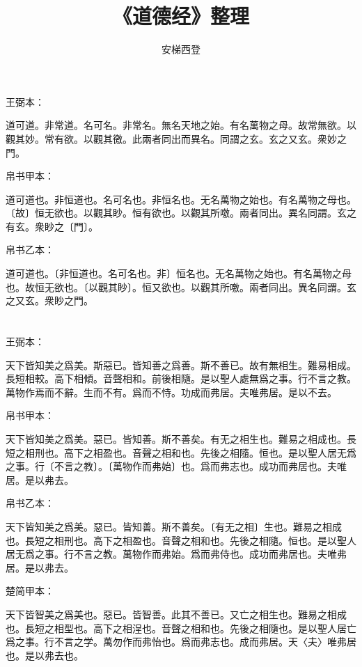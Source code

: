\documentclass[a5paper]{ctexbook}
\title{《道德经》整理}
\author{安梯西登}
\date{}
\begin{document}
    \maketitle

    \tableofcontents

    \chapter{}
    王弼本：

    道可道。非常道。名可名。非常名。無名天地之始。有名萬物之母。故常無欲。以觀其妙。常有欲。以觀其徼。此兩者同出而異名。同謂之玄。玄之又玄。衆妙之門。

    
    帛书甲本：

    道可道也。非恒道也。名可名也。非恒名也。无名萬物之始也。有名萬物之母也。〔故〕恒无欲也。以觀其眇。恒有欲也。以觀其所噭。兩者同出。異名同謂。玄之有玄。衆眇之〔門〕。

    帛书乙本：

    道可道也。〔非恒道也。名可名也。非〕恒名也。无名萬物之始也。有名萬物之母也。故恒无欲也。〔以觀其眇〕。恒又欲也。以觀其所噭。兩者同出。異名同謂。玄之又玄。衆眇之門。

    \chapter{}
    王弼本：

    天下皆知美之爲美。斯惡已。皆知善之爲善。斯不善已。故有無相生。難易相成。長短相較。高下相傾。音聲相和。前後相隨。是以聖人處無爲之事。行不言之教。萬物作焉而不辭。生而不有。爲而不恃。功成而弗居。夫唯弗居。是以不去。

    
    帛书甲本：

    天下皆知美之爲美。惡已。皆知善。斯不善矣。有无之相生也。難易之相成也。長短之相刑也。高下之相盈也。音聲之相和也。先後之相隨。恒也。是以聖人居无爲之事。行〔不言之教〕。〔萬物作而弗始〕也。爲而弗志也。成功而弗居也。夫唯居。是以弗去。

    帛书乙本：

    天下皆知美之爲美。惡已。皆知善。斯不善矣。〔有无之相〕生也。難易之相成也。長短之相刑也。高下之相盈也。音聲之相和也。先後之相隨。恒也。是以聖人居无爲之事。行不言之教。萬物作而弗始。爲而弗侍也。成功而弗居也。夫唯弗居。是以弗去。

    楚简甲本：

    天下皆智美之爲美也。惡已。皆智善。此其不善已。又亡之相生也。難易之相成也。長短之相型也。高下之相浧也。音聲之相和也。先後之相隨也。是以聖人居亡爲之事。行不言之学。萬勿作而弗怡也。爲而弗志也。成而弗居。天〈夫〉唯弗居也。是以弗去也。
\end{document}
